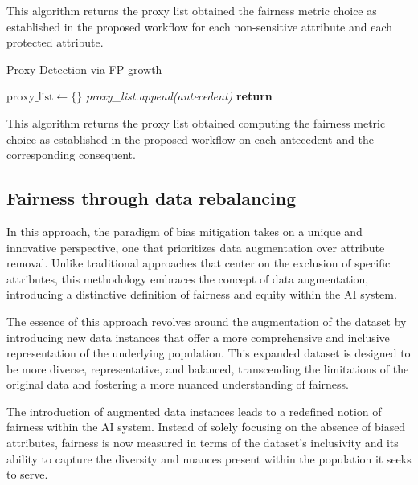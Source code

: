 This algorithm returns the proxy list obtained the fairness metric choice as established in the proposed workflow for each non-sensitive attribute and each protected attribute.

\begin{algorithm}[H]
    \caption{Proxy Detection via FP-growth}
    \label{alg:proxy_detection_fp_growth}
    \begin{algorithmic}[1]
        \State $\text{proxy\_list} \gets \{\}$ 
                    \State \textit{proxy\_list.append(antecedent)}
                \EndIf
            \EndFor
        \EndFor
        \State \textbf{return} 
    \end{algorithmic}
\end{algorithm}

This algorithm returns the proxy list obtained computing the fairness metric choice as established in the proposed workflow on each antecedent and the corresponding consequent.

\subsection{Fairness through data rebalancing}

In this approach, the paradigm of bias mitigation takes on a unique and innovative perspective, one that prioritizes data augmentation over attribute removal. Unlike traditional approaches that center on the exclusion of specific attributes, this methodology embraces the concept of data augmentation, introducing a distinctive definition of fairness and equity within the AI system.

The essence of this approach revolves around the augmentation of the dataset by introducing new data instances that offer a more comprehensive and inclusive representation of the underlying population. This expanded dataset is designed to be more diverse, representative, and balanced, transcending the limitations of the original data and fostering a more nuanced understanding of fairness. 

The introduction of augmented data instances leads to a redefined notion of fairness within the AI system. Instead of solely focusing on the absence of biased attributes, fairness is now measured in terms of the dataset's inclusivity and its ability to capture the diversity and nuances present within the population it seeks to serve. 

